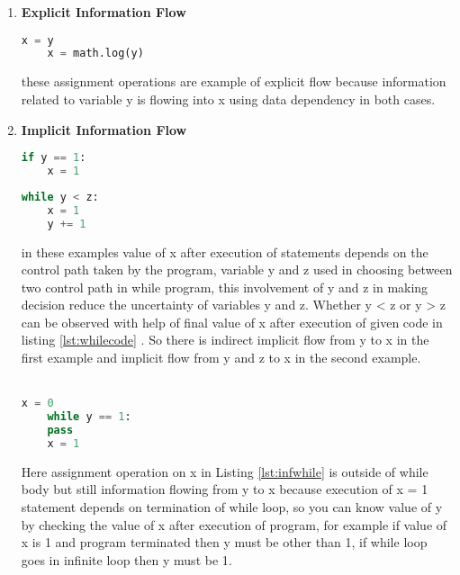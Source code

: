 \begin{enumerate}
	\item{\textbf{Explicit Information Flow}}\\
	\begin{lstlisting}[language=Python, caption=Python example]
	x = y
	x = math.log(y)\end{lstlisting}
	these assignment operations are example of explicit flow because information related to variable y is flowing into x using data dependency in both cases.
	\item{\textbf{Implicit Information Flow}}\\
	\begin{lstlisting}[language=Python, caption=Python example]
	if y == 1:
	x = 1
	\end{lstlisting}
	\pagebreak
	\begin{lstlisting}[language=Python, caption=Python example, label=lst:whilecode]
	while y < z:
	x = 1
	y += 1\end{lstlisting}
	in these examples value of x after execution of statements depends on the control path
	taken by the program, variable y and z used in choosing between two control path in while
	program, this involvement of y and z in making decision reduce the uncertainty of variables
	y and z. Whether y < z or y > z can be observed with help of final value of x after execution of given code in listing \ref{lst:whilecode} . So there is indirect implicit flow from y to x in the first example and implicit flow from y
	and z to x in the second example\cite{denning}.\\~\\
	\begin{lstlisting}[language=Python, caption=Python example, label=lst:infwhile]
	x = 0
	while y == 1:
	pass
	x = 1\end{lstlisting}
	Here assignment operation on x in Listing \ref{lst:infwhile} is outside of while body but still information flowing from y to x because execution of x = 1 statement depends on termination of while loop, so you can know value of y by checking the value of x after execution of program, for example if value of x is 1 and program terminated then y must be other than 1, if while loop goes in infinite loop then y must be 1.
	

\end{enumerate}
